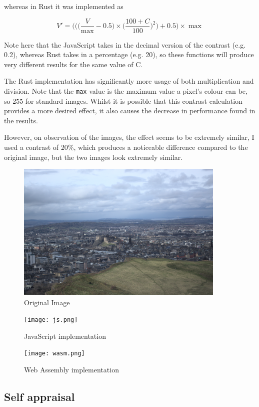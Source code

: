 \documentclass[12pt,a4paper]{article}
\begin{document}
whereas in Rust it was implemented as

$$
    V'=\bigg(\bigg(\bigg(\frac{V}{\max}-0.5)\times\bigg(\frac{100+C}{100}\bigg)^2\bigg)+0.5\bigg)\times \max
$$

Note here that the JavaScript takes in the decimal version of the contrast (e.g. 0.2), whereas Rust takes in a percentage (e.g. 20), so these functions will produce very different results for the same value of C.

The Rust implementation has significantly more usage of both multiplication and division. Note that the \texttt{max} value is the maximum value a pixel's colour can be, so 255 for standard images. Whilst it is possible that this contrast calculation provides a more desired effect, it also causes the decrease in performance found in the results.

However, on observation of the images, the effect seems to be extremely similar, I used a contrast of 20\%, which produces a noticeable difference compared to the original image, but the two images look extremely similar.

\begin{figure}[H]
    \centering
    \includegraphics[width=10cm]{no_blur.png}
    \caption{Original Image}
\end{figure}
\begin{figure}[H]
    \centering
    \texttt{[image: js.png]}
    \caption{JavaScript implementation}
\end{figure}
\begin{figure}[H]
    \centering
    \texttt{[image: wasm.png]}
    \caption{Web Assembly implementation}
\end{figure}


\subsection{Self appraisal}
\end{document}
